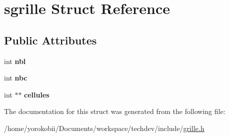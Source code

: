 \hypertarget{structsgrille}{}\section{sgrille Struct Reference}
\label{structsgrille}
\subsection*{Public Attributes}
\begin{DoxyCompactItemize}
\item 
int {\bfseries nbl}\hypertarget{structsgrille_ac92cacf733aa42cd1c1e2acda31ba70e}{}\label{structsgrille_ac92cacf733aa42cd1c1e2acda31ba70e}

\item 
int {\bfseries nbc}\hypertarget{structsgrille_afd62d1f211b4c4651022f10f281d7187}{}\label{structsgrille_afd62d1f211b4c4651022f10f281d7187}

\item 
int $\ast$$\ast$ {\bfseries cellules}\hypertarget{structsgrille_a2e50f8e4ad4c17107e19d4e081c5a486}{}\label{structsgrille_a2e50f8e4ad4c17107e19d4e081c5a486}

\end{DoxyCompactItemize}


The documentation for this struct was generated from the following file\+:\begin{DoxyCompactItemize}
\item 
/home/yorokobii/\+Documents/workspace/techdev/include/\hyperlink{grille_8h}{grille.\+h}\end{DoxyCompactItemize}
